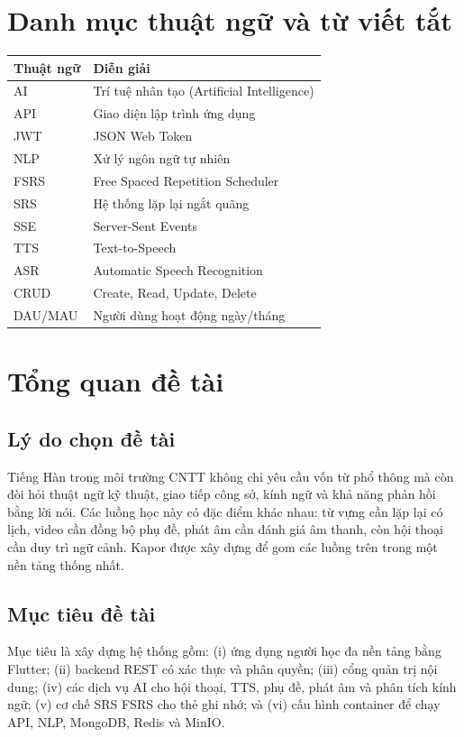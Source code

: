 \documentclass[12pt,a4paper]{report}
\begin{document}
\chapter*{Danh mục thuật ngữ và từ viết tắt}
\begin{longtable}{p{}p{}}
\toprule
Thuật ngữ & Diễn giải\\\midrule
AI & Trí tuệ nhân tạo (Artificial Intelligence)\\
API & Giao diện lập trình ứng dụng\\
JWT & JSON Web Token\\
NLP & Xử lý ngôn ngữ tự nhiên\\
FSRS & Free Spaced Repetition Scheduler\\
SRS & Hệ thống lặp lại ngắt quãng\\
SSE & Server-Sent Events\\
TTS & Text-to-Speech\\
ASR & Automatic Speech Recognition\\
CRUD & Create, Read, Update, Delete\\
DAU/MAU & Người dùng hoạt động ngày/tháng\\
\bottomrule
\end{longtable}

\tableofcontents\listoffigures\listoftables

\chapter{Tổng quan đề tài}
\section{Lý do chọn đề tài}
Tiếng Hàn trong môi trường CNTT không chỉ yêu cầu vốn từ phổ thông mà còn đòi hỏi thuật ngữ kỹ thuật, giao tiếp công sở, kính ngữ và khả năng phản hồi bằng lời nói. Các luồng học này có đặc điểm khác nhau: từ vựng cần lặp lại có lịch, video cần đồng bộ phụ đề, phát âm cần đánh giá âm thanh, còn hội thoại cần duy trì ngữ cảnh. Kapor được xây dựng để gom các luồng trên trong một nền tảng thống nhất.

\section{Mục tiêu đề tài}
Mục tiêu là xây dựng hệ thống gồm: (i) ứng dụng người học đa nền tảng bằng Flutter; (ii) backend REST có xác thực và phân quyền; (iii) cổng quản trị nội dung; (iv) các dịch vụ AI cho hội thoại, TTS, phụ đề, phát âm và phân tích kính ngữ; (v) cơ chế SRS FSRS cho thẻ ghi nhớ; và (vi) cấu hình container để chạy API, NLP, MongoDB, Redis và MinIO.
\end{document}
